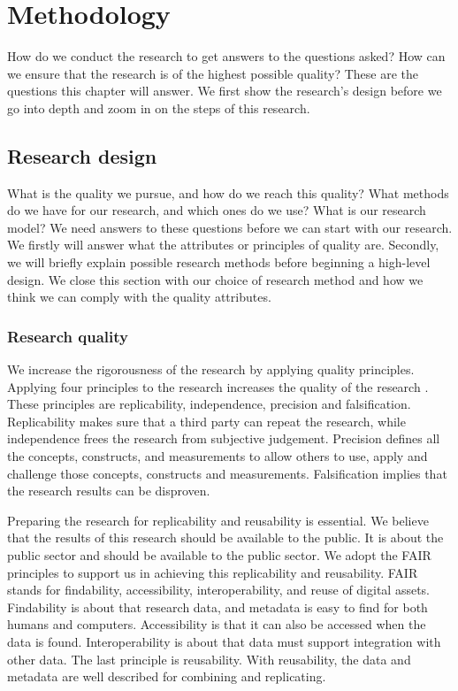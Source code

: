 \chapter{Methodology}
\setcounter{footnote}{0}
\label{ch:methodology}
How do we conduct the research to get answers to the questions asked? How can we ensure that the research is of the highest possible quality? These are the questions this chapter will answer. We first show the research's design before we go into depth and zoom in on the steps of this research.

\section{Research design}
\label{sec:researchquality}
What is the quality we pursue, and how do we reach this quality? What methods do we have for our research, and which ones do we use? What is our research model? We need answers to these questions before we can start with our research. We firstly will answer what the attributes or principles of quality are. Secondly, we will briefly explain possible research methods before beginning a high-level design. We close this section with our choice of research method and how we think we can comply with the quality attributes.

\subsection{Research quality}
\label{sub:researchquality}
We increase the rigorousness of the research by applying quality principles. Applying four principles to the research increases the quality of the research \parencite[p.~15--17]{Recker2012}. These principles are replicability, independence, precision and falsification. Replicability makes sure that a third party can repeat the research, while independence frees the research from subjective judgement. Precision defines all the concepts, constructs, and measurements to allow others to use, apply and challenge those concepts, constructs and measurements. Falsification implies that the research results can be disproven.

Preparing the research for replicability and reusability is essential. We believe that the results of this research should be available to the public. It is about the public sector and should be available to the public sector. We adopt the FAIR principles \parencite{Wilkinson2016} to support us in achieving this replicability and reusability. FAIR stands for findability, accessibility, interoperability, and reuse of digital assets. Findability is about that research data, and metadata is easy to find for both humans and computers. Accessibility is that it can also be accessed when the data is found. Interoperability is about that data must support integration with other data. The last principle is reusability. With reusability, the data and metadata are well described for combining and replicating.

